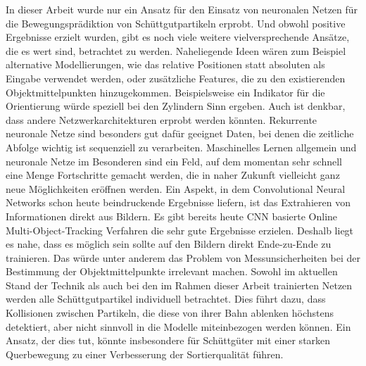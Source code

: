 In dieser Arbeit wurde nur ein Ansatz für den Einsatz von neuronalen Netzen für die Bewegungsprädiktion von Schüttgutpartikeln erprobt.
Und obwohl positive Ergebnisse erzielt wurden, gibt es noch viele weitere vielversprechende Ansätze, die es wert sind, betrachtet zu werden.
Naheliegende Ideen wären zum Beispiel alternative Modellierungen, wie das relative Positionen statt absoluten als Eingabe verwendet werden, 
oder zusätzliche Features, die zu den existierenden Objektmittelpunkten hinzugekommen.
Beispielsweise ein Indikator für die Orientierung würde speziell bei den Zylindern Sinn ergeben.
Auch ist denkbar, dass andere Netzwerkarchitekturen erprobt werden könnten. 
Rekurrente neuronale Netze sind besonders gut dafür geeignet Daten, bei denen die zeitliche Abfolge wichtig ist sequenziell zu verarbeiten.
Maschinelles Lernen allgemein und neuronale Netze im Besonderen sind ein Feld, auf dem momentan sehr schnell eine Menge Fortschritte gemacht werden,
die in naher Zukunft vielleicht ganz neue Möglichkeiten eröffnen werden.
Ein Aspekt, in dem Convolutional Neural Networks schon heute beindruckende Ergebnisse liefern, ist das Extrahieren von Informationen direkt aus Bildern.
Es gibt bereits heute CNN basierte Online Multi-Object-Tracking Verfahren die sehr gute Ergebnisse erzielen. 
Deshalb liegt es nahe, dass es möglich sein sollte auf den Bildern direkt Ende-zu-Ende zu trainieren.
Das würde unter anderem das Problem von Messunsicherheiten bei der Bestimmung der Objektmittelpunkte irrelevant machen.
Sowohl im aktuellen Stand der Technik als auch bei den im Rahmen dieser Arbeit trainierten Netzen werden alle Schüttgutpartikel individuell betrachtet.
Dies führt dazu, dass Kollisionen zwischen Partikeln, die diese von ihrer Bahn ablenken höchstens detektiert, aber nicht sinnvoll in die Modelle miteinbezogen werden können.
Ein Ansatz, der dies tut, könnte insbesondere für Schüttgüter mit einer starken Querbewegung zu einer Verbesserung der Sortierqualität führen.


